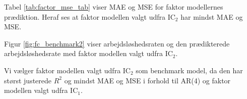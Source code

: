 Tabel \ref{tab:factor_mse_tab} viser MAE og MSE for faktor modellernes prædiktion.
Heraf ses at faktor modellen valgt udfra IC\(_2\) har mindst MAE og MSE.



Figur \ref{fig:fc_benchmark2} viser arbejdsløshedsraten og den prædikterede arbejdsløshedsrate med faktor modellen valgt udfra IC\(_2\).

Vi vælger faktor modellen valgt udfra IC\(_2\) som benchmark model, da den har størst justerede \(R^2\) og mindst MAE og MSE i forhold til AR(4) og faktor modellen valgt udfra IC\(_1\).
